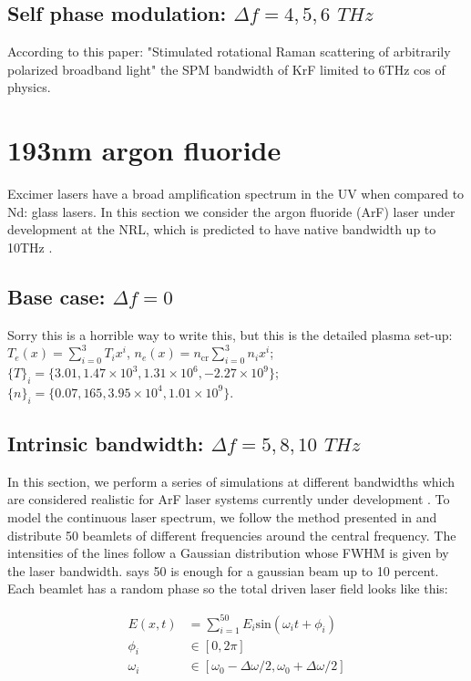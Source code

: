 \subsection{Self phase modulation: $\Delta f=4,5,6$ $\si{THz}$}

According to this paper: "Stimulated rotational Raman scattering of arbitrarily polarized broadband light" \citep{Lehmberg2020} the SPM bandwidth of KrF limited to 6THz cos of physics.

\section{193nm argon fluoride}\label{sec:193}
Excimer lasers have a broad amplification spectrum in the UV when compared to Nd: glass lasers. In this section we consider the argon fluoride (ArF) laser under development at the NRL, which is predicted to have native bandwidth up to 10THz \citep{Obenschain2020}.

\subsection{Base case: $\Delta f=0$}
Sorry this is a horrible way to write this, but this is the detailed plasma set-up: $T_e(x) = \sum^3_{i=0} T_i x^i$, $n_e(x) = n_{\mathrm{cr}}\sum^3_{i=0} n_i x^i $;
$\{T\}_i  = \{3.01, 1.47\times10^3,1.31\times10^6,-2.27\times10^9\}$;
$\{n\}_i  = \{0.07, 165, 3.95\times10^4, 1.01\times10^9\}$.



\subsection{Intrinsic bandwidth: $\Delta f =5,8,10$ $\si{THz}$}
In this section, we perform a series of simulations at different bandwidths which are considered realistic for ArF laser systems currently under development \citep{Obenschain2020}. To model the continuous laser spectrum, we follow the method presented in \citet{Bates2020} and distribute 50 beamlets of different frequencies around the central frequency. The intensities of the lines follow a Gaussian distribution whose FWHM is given by the laser bandwidth. \citet{Follett2019} says 50 is enough for a gaussian beam up to 10 percent. Each beamlet has a random phase so the total driven laser field looks like this:



\begin{equation}
\begin{aligned}
	E(x,t) &= \sum_{i=1}^{50} E_i \mathrm{sin}(\omega_i t + \phi_i) \\
	\phi_i & \in  [0,2\pi] \\
	\omega_i & \in [\omega_0 - \Delta\omega / 2, \omega_0 + \Delta\omega / 2]
\end{aligned}
\end{equation}


